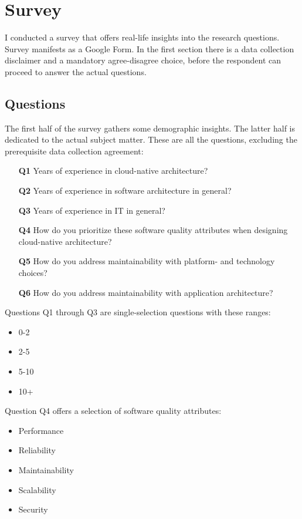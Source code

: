 \documentclass[utf8,english]{gradu3}
\begin{document}
\section{Survey}

I conducted a survey that offers real-life insights into the research questions.
Survey manifests as a Google Form.
In the first section there is a data collection disclaimer and a mandatory agree-disagree choice,
before the respondent can proceed to answer the actual questions.


\subsection{Questions}
The first half of the survey gathers some demographic insights.
The latter half is dedicated to the actual subject matter.
These are all the questions, excluding the prerequisite data collection agreement:
\begin{enumerate}
  \item [\textbf{Q1}] Years of experience in cloud-native architecture?
  \item [\textbf{Q2}] Years of experience in software architecture in general?
  \item [\textbf{Q3}] Years of experience in IT in general?
  \item [\textbf{Q4}] How do you prioritize these software quality attributes when designing cloud-native
        architecture?
  \item [\textbf{Q5}] How do you address maintainability with platform- and technology choices?
  \item [\textbf{Q6}] How do you address maintainability with application architecture?
\end{enumerate}

Questions Q1 through Q3 are single-selection questions with these ranges:
\begin{itemize}
  \item 0-2
  \item 2-5
  \item 5-10
  \item 10+
\end{itemize}

Question Q4 offers a selection of software quality attributes:
\begin{itemize}
  \item Performance
  \item Reliability
  \item Maintainability
  \item Scalability
  \item Security
\end{itemize}
\end{document}
